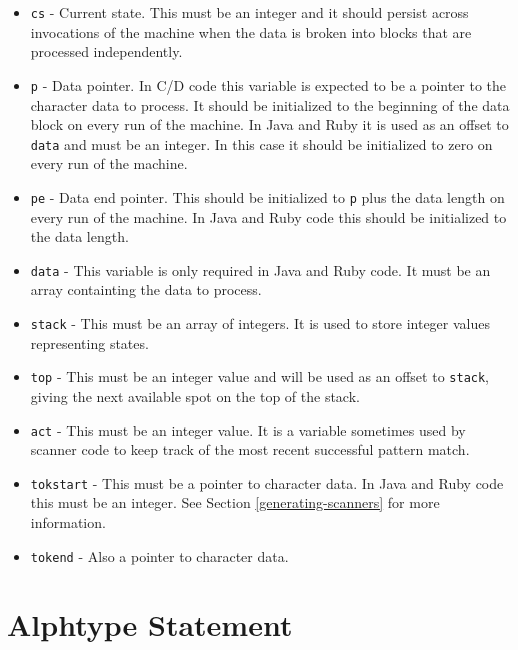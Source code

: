 \documentclass[letterpaper,11pt,oneside]{book}
\begin{document}
\begin{itemize}

\item \verb|cs| - Current state. This must be an integer and it should persist
across invocations of the machine when the data is broken into blocks that are
processed independently.

\item \verb|p| - Data pointer. In C/D code this variable is expected to be a
pointer to the character data to process. It should be initialized to the
beginning of the data block on every run of the machine. In Java and Ruby it is
used as an offset to \verb|data| and must be an integer. In this case it should
be initialized to zero on every run of the machine.

\item \verb|pe| - Data end pointer. This should be initialized to \verb|p| plus
the data length on every run of the machine. In Java and Ruby code this should
be initialized to the data length.

\item \verb|data| - This variable is only required in Java and Ruby code. It
must be an array containting the data to process.

\item \verb|stack| - This must be an array of integers. It is used to store
integer values representing states.

\item \verb|top| - This must be an integer value and will be used as an offset
to \verb|stack|, giving the next available spot on the top of the stack.

\item \verb|act| - This must be an integer value. It is a variable sometimes
used by scanner code to keep track of the most recent successful pattern match.

\item \verb|tokstart| - This must be a pointer to character data. In Java and
Ruby code this must be an integer. See Section \ref{generating-scanners} for
more information.

\item \verb|tokend| - Also a pointer to character data.

\end{itemize}

\section{Alphtype Statement}
\end{document}
